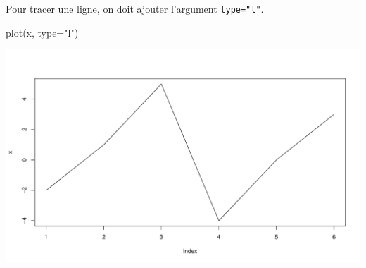 \documentclass[
  8pt,
  ignorenonframetext,
]{beamer}
\newenvironment{Shaded}{\begin{snugshade}}{\end{snugshade}}
\newcommand{\AttributeTok}[1]{\textcolor[rgb]{0.77,0.63,0.00}{#1}}
\newcommand{\FunctionTok}[1]{\textcolor[rgb]{0.00,0.00,0.00}{#1}}
\newcommand{\NormalTok}[1]{#1}
\newcommand{\StringTok}[1]{\textcolor[rgb]{0.31,0.60,0.02}{#1}}
\begin{document}
\begin{frame}[fragile]
Pour tracer une ligne, on doit ajouter l'argument \texttt{type="l"}.

\begin{Shaded}
\begin{Highlighting}[]
\FunctionTok{plot}\NormalTok{(x, }\AttributeTok{type=}\StringTok{"l"}\NormalTok{)}
\end{Highlighting}
\end{Shaded}

\includegraphics{Chap2_R_files/figure-beamer/unnamed-chunk-2-1.pdf}
\end{frame}
\end{document}
